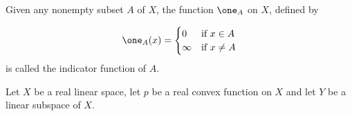 Given any nonempty subset $A$ of $X$, the function $\one_A$ on $X$, defined by

\begin{equation*}
	\one_A(x)=\begin{cases}
	0 & \text{if } x \in A\\
	\infty & \text{if } x \neq A
	\end{cases}
\end{equation*}
is called the indicator function of $A$. 


\begin{theorem}
	Let $X$ be a real linear space, let $p$ be a real convex function on $X$ and let $Y$ be a linear subspace of $X$. 
\end{theorem}


